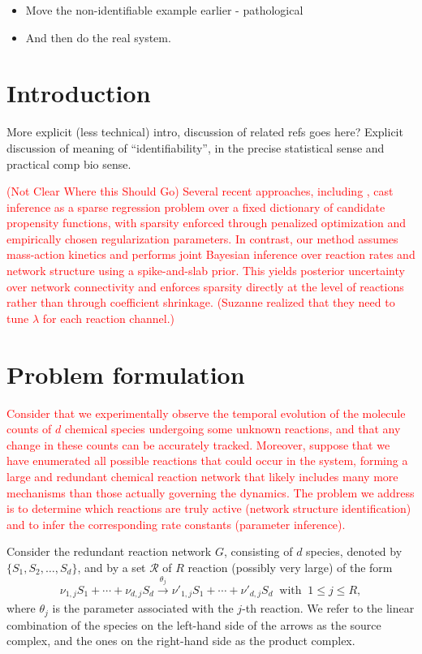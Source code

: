 \documentclass[pdflatex,sn-mathphys-num]{sn-jnl}%
\theoremstyle{thmstyleone}%
\theoremstyle{thmstyletwo}%
\theoremstyle{thmstylethree}%
\begin{document}
\begin{itemize}
\item Move the non-identifiable example earlier - pathological 
\item And then do the real system.
\end{itemize}

\newpage

\section{Introduction}



More explicit (less technical) intro, discussion of related refs goes here? Explicit discussion of meaning of ``identifiability'', in the precise statistical sense and practical comp bio sense. 

\textcolor{red}{(Not Clear Where this Should Go) Several recent approaches, including \cite{siam_Zhang2019},  cast inference as a sparse regression problem over a fixed dictionary of candidate propensity functions, with sparsity enforced through penalized optimization and empirically chosen regularization parameters. In contrast, our method assumes mass-action kinetics and performs joint Bayesian inference over reaction rates and network structure using a spike-and-slab prior. This yields posterior uncertainty over network connectivity and enforces sparsity directly at the level of reactions rather than through coefficient shrinkage. (Suzanne realized that they need to tune $\lambda$ for each reaction channel.)}

\newpage

\section{Problem formulation}
\textcolor{red}{Consider that we experimentally observe the temporal evolution of the molecule counts of $d$ chemical species undergoing some unknown reactions, and that any change in these counts can be accurately tracked. Moreover, suppose that we have enumerated all possible reactions that could occur in the system, forming a large and redundant chemical reaction network that likely includes many more mechanisms than those actually governing the dynamics. The problem we address is to determine which reactions are truly active (network structure identification) and to infer the corresponding rate constants (parameter inference).}


Consider the redundant reaction network $G$, consisting of $d$  species, denoted by $\{ S_1, S_2, \ldots, S_d \}$, and by a set $\mathcal{R}$ of $R$ reaction (possibly very large) of the form
\begin{equation} \label{ex_intro}
\nu_{1,j} S_1 + \cdots + \nu_{d, j} S_d
\xrightarrow[]{\theta_j} \nu'_{1,j} S_1 + \cdots + \nu'_{d, j} S_d
\ \text{ with } \
1 \leq j \leq R,
\end{equation}
where $\theta_j$ is the parameter associated with the $j$-th reaction.
We refer to the linear combination of the species on the left-hand side of the arrows as the source complex, and the ones on the right-hand side as the product complex.
\end{document}
